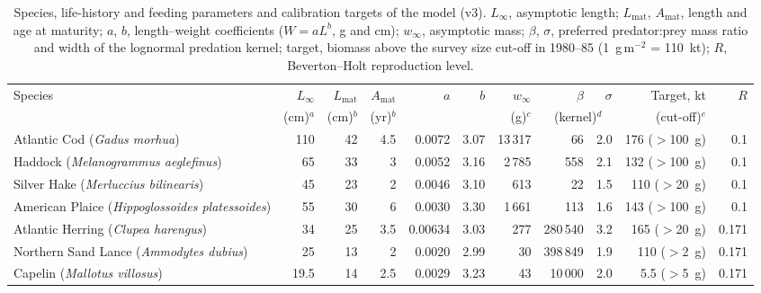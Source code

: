 \documentclass[12pt,letterpaper,fleqn]{article}
\newcommand{\gm}{g\,m$^{-2}$}
\begin{document}
\clearpage
\nolinenumbers
\begin{table}[p]
\caption{Species, life-history and feeding parameters and calibration targets of the model (v3). $L_\infty$, asymptotic length; $L_{\mathrm{mat}}$, $A_{\mathrm{mat}}$, length and age at maturity; $a$, $b$, length--weight coefficients ($W=aL^{b}$, g and cm); $w_\infty$, asymptotic mass; $\beta$, $\sigma$, preferred predator:prey mass ratio and width of the lognormal predation kernel; target, biomass above the survey size cut-off in 1980--85 (1~\gm{} = 110~kt); $R$, Beverton--Holt reproduction level.}
\label{tab:species}
\footnotesize
\begin{adjustbox}{max width=\textwidth}\begin{tabular}{@{}>{\raggedright\arraybackslash}p{3.3cm}rrrrrrrrrr@{}}
\toprule
Species & $L_\infty$ & $L_{\mathrm{mat}}$ & $A_{\mathrm{mat}}$ & $a$ & $b$ & $w_\infty$ & $\beta$ & $\sigma$ & Target, kt & $R$\\
 & (cm)$^{a}$ & (cm)$^{b}$ & (yr)$^{b}$ & & & (g)$^{c}$ & \multicolumn{2}{c}{(kernel)$^{d}$} & (cut-off)$^{e}$ & \\
\midrule
Atlantic Cod \newline\hspace*{0.5em}(\textit{Gadus morhua}) & 110 & 42 & 4.5 & 0.0072 & 3.07 & 13\,317 & 66 & 2.0 & 176 ($>$100~g) & 0.1\\
Haddock \newline\hspace*{0.5em}(\textit{Melanogrammus aeglefinus}) & 65 & 33 & 3 & 0.0052 & 3.16 & 2\,785 & 558 & 2.1 & 132 ($>$100~g) & 0.1\\
Silver Hake \newline\hspace*{0.5em}(\textit{Merluccius bilinearis}) & 45 & 23 & 2 & 0.0046 & 3.10 & 613 & 22 & 1.5 & 110 ($>$20~g) & 0.1\\
American Plaice \newline\hspace*{0.5em}(\textit{Hippoglossoides platessoides}) & 55 & 30 & 6 & 0.0030 & 3.30 & 1\,661 & 113 & 1.6 & 143 ($>$100~g) & 0.1\\
Atlantic Herring \newline\hspace*{0.5em}(\textit{Clupea harengus}) & 34 & 25 & 3.5 & 0.00634 & 3.03 & 277 & 280\,540 & 3.2 & 165 ($>$20~g) & 0.171\\
Northern Sand Lance \newline\hspace*{0.5em}(\textit{Ammodytes dubius}) & 25 & 13 & 2 & 0.0020 & 2.99 & 30 & 398\,849 & 1.9 & 110 ($>$2~g) & 0.171\\
Capelin \newline\hspace*{0.5em}(\textit{Mallotus villosus}) & 19.5 & 14 & 2.5 & 0.0029 & 3.23 & 43 & 10\,000 & 2.0 & 5.5 ($>$5~g) & 0.171\\
\bottomrule
\end{tabular}\end{adjustbox}


\end{table}
\end{document}
